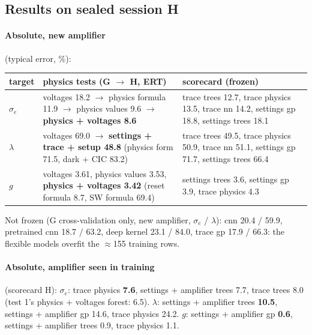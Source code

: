\documentclass[10pt,a4paper]{article}
\begin{document}
\subsection{Results on sealed session H}
\paragraph{Absolute, new amplifier} (typical error, \%):
\begin{center}\small
\begin{tabularx}{\linewidth}{@{}lXX@{}}\toprule
target & physics tests (G $\to$ H, ERT) & scorecard (frozen)\\\midrule
$\sigma_e$ & voltages 18.2 $\to$ physics formula 11.9 $\to$ physics values 9.6 $\to$ \textbf{physics + voltages 8.6} &
  trace trees 12.7, trace physics 13.5, trace nn 14.2, settings gp 18.8, settings trees 18.1\\
$\lambda$ & voltages 69.0 $\to$ \textbf{settings + trace + setup 48.8} (physics form 71.5, dark + CIC 83.2) &
  trace trees 49.5, trace physics 50.9, trace nn 51.1, settings gp 71.7, settings trees 66.4\\
$g$ & voltages 3.61, physics values 3.53, \textbf{physics + voltages 3.42} (reset formula 8.7, SW formula 69.4) &
  settings trees 3.6, settings gp 3.9, trace physics 4.3\\\bottomrule
\end{tabularx}
\end{center}
Not frozen (G cross-validation only, new amplifier, $\sigma_e$ / $\lambda$): cnn 20.4 / 59.9, pretrained cnn 18.7 / 63.2,
deep kernel 23.1 / 84.0, trace gp 17.9 / 66.3: the flexible models overfit the $\approx$155 training rows.

\paragraph{Absolute, amplifier seen in training} (scorecard H): $\sigma_e$: trace physics \textbf{7.6}, settings + amplifier trees 7.7,
trace trees 8.0 (test 1's physics + voltages forest: 6.5). $\lambda$: settings + amplifier trees \textbf{10.5}, settings + amplifier gp
14.6, trace physics 24.2. $g$: settings + amplifier gp \textbf{0.6}, settings + amplifier trees 0.9, trace physics 1.1.
\end{document}
